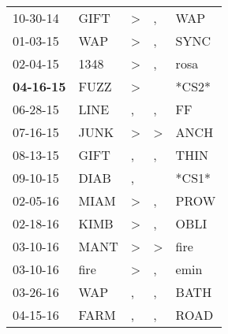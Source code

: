 \begin{supertabular}{p{0.07\textwidth}p{0.06\textwidth}p{0.02\textwidth}p{0.02\textwidth}p{0.06\textwidth}}
          10-30-14\textsuperscript{} &           GIFT\textsuperscript{} &     \textgreater &                , &            WAP\textsuperscript{} \\
          01-03-15\textsuperscript{} &            WAP\textsuperscript{} &     \textgreater &                , &           SYNC\textsuperscript{} \\
          02-04-15\textsuperscript{} &           1348\textsuperscript{} &     \textgreater &                , &           rosa\textsuperscript{} \\
 \textbf{04-16-15\textsuperscript{}} &           FUZZ\textsuperscript{} &     \textgreater &                  &                            *CS2* \\
          06-28-15\textsuperscript{} &           LINE\textsuperscript{} &                , &                , &             FF\textsuperscript{} \\
          07-16-15\textsuperscript{} &           JUNK\textsuperscript{} &     \textgreater &     \textgreater &           ANCH\textsuperscript{} \\
          08-13-15\textsuperscript{} &           GIFT\textsuperscript{} &                , &                , &           THIN\textsuperscript{} \\
          09-10-15\textsuperscript{} &           DIAB\textsuperscript{} &                , &                  &                            *CS1* \\
          02-05-16\textsuperscript{} &           MIAM\textsuperscript{} &     \textgreater &                , &           PROW\textsuperscript{} \\
          02-18-16\textsuperscript{} &           KIMB\textsuperscript{} &     \textgreater &                , &           OBLI\textsuperscript{} \\
          03-10-16\textsuperscript{} &           MANT\textsuperscript{} &     \textgreater &     \textgreater &           fire\textsuperscript{} \\
          03-10-16\textsuperscript{} &           fire\textsuperscript{} &     \textgreater &                , &           emin\textsuperscript{} \\
          03-26-16\textsuperscript{} &            WAP\textsuperscript{} &                , &                , &           BATH\textsuperscript{} \\
          04-15-16\textsuperscript{} &           FARM\textsuperscript{} &                , &                , &           ROAD\textsuperscript{} \\

\end{supertabular}
